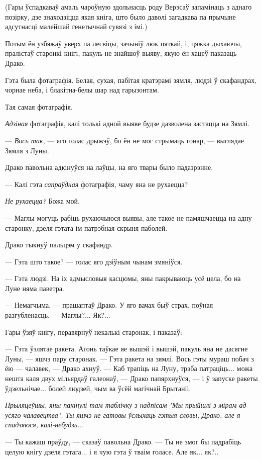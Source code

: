 (Гары ўспадкаваў амаль чароўную здольнасць роду Верэсаў запамінаць з аднаго позірку,
дзе знаходзіцца якая кніга, што было даволі загадкава па прычыне адсутнасці 
малейшай генетычнай сувязі з імі.)

Потым ён узбяжаў уверх па лесвіцы, зачыніў люк пяткай, і, цяжка дыхаючы, пралістаў
старонкі кнігі, пакуль не знайшоў выяву, якую ён хацеў паказаць Драко.

Гэта была фотаграфія. Белая, сухая, пабітая кратэрамі зямля, людзі ў скафандрах, 
чорнае неба, і блакітна-белы шар над гарызонтам.

Тая самая фотаграфія.

\emph{Адзіная} фотаграфія, калі толькі адной выяве будзе дазволена застацца на Зямлі.

--- \emph{Вось так}, --- яго голас дрыжэў, бо ён не мог стрымаць гонар, --- выглядае Зямля
з Луны.

Драко павольна адкінуўся на лаўцы, на яго твары было падазрэнне.

--- Калі гэта \emph{сапраўдная} фотаграфія, чаму яна не рухаецца? 

\emph{Не рухаецца?} Божа мой.

--- Маглы могуць рабіць рухаючыюся выявы, але такое не памяшчаецца на адну старонку,
дзеля гэтата ім патрэбная скрыня паболей.

Драко тыкнуў пальцэм у скафандр.

--- Гэта што такое? --- голас яго дзіўным чынам змяніўся.

--- Гэта людзі. На іх адмысловыя касцюмы, яны пакрываюць усё цела, бо на Луне няма
паветра.

--- Немагчыма, --- прашаптаў Драко. У яго вачах быў страх, поўная разгубленасць.
--- Маглы?... Як?...

Гары ўзяў кнігу, перавярнуў некалькі старонак, і паказаў:

--- Гэта ўзлятае ракета. Агонь таўкае яе вышэй і вышэй, пакуль яна не дасягне Луны, 
--- яшчэ пару старонак. --- Гэта ракета на зямлі. Вось гэты мураш побач з ёю --- чалавек,
--- Драко ахнуў. --- Каб трапіць на Луну, трэба патраціць... можа нешта каля 
двух мільярдаў галеонаў, --- Драко папярхнуўся, --- і ў запуске ракеты ўдзельнічае...
болей людзей, чым ва ўсёй магічнай Брытаніі.

\emph{Прыляцеўшы, яны пакінулі там таблічку з надпісам "Мы прыйшлі з мірам ад 
усяго чалавецтва". Ты яшчэ не гатовы ўслыхаць гэтыя словы, Драко, але я спадзяюся,
калі-небудзь...}

--- Ты кажаш праўду, --- сказаў павольна Драко. --- Ты не змог бы падрабіць целую кнігу
дзеля гэтага... і я чую гэта ў тваім голасе. Але як... як?..

